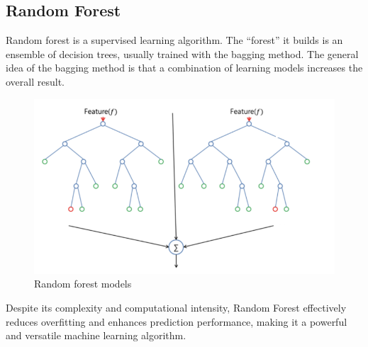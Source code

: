 \documentclass{ieeeojies}
\begin{document}
\subsection{Random Forest}
Random forest is a supervised learning algorithm. The “forest” it builds is an ensemble of decision trees, usually trained with the bagging method. The general idea of the bagging method is that a combination of learning models increases the overall result.
\begin{figure}[H]
  \centering
  \begin{minipage}{0.8\linewidth}
  \centering

  \includegraphics[width=1\textwidth]{bibliography/Figure/RF_work.png}
  \caption{Random forest models}
  \label{fig:1}
  \end{minipage}
\end{figure}
Despite its complexity and computational intensity, Random Forest effectively reduces overfitting and enhances prediction performance, making it a powerful and versatile machine learning algorithm.
\end{document}
